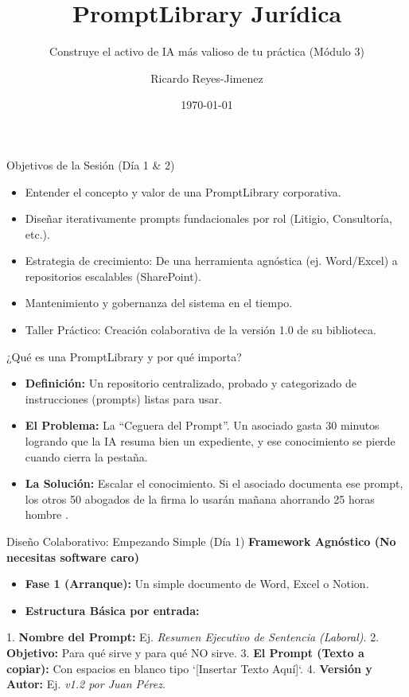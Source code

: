 \documentclass[aspectratio=169]{beamer}
\title[ PromptLibrary Jurídica]{ PromptLibrary Jurídica}
\subtitle{ Construye el activo de IA más valioso de tu práctica (Módulo 3)}
\author{Ricardo Reyes-Jimenez}
\institute{Universidad de La Sabana}
\date{\today}
\begin{document}
\begin{frame}
  \titlepage
\end{frame}

\usebackgroundtemplate{}


\begin{frame}{Objetivos de la Sesión (Día 1 \& 2)}
\begin{itemize}
  \item Entender el concepto y valor de una PromptLibrary corporativa.
  \item Diseñar iterativamente prompts fundacionales por rol (Litigio, Consultoría, etc.).
  \item Estrategia de crecimiento: De una herramienta agnóstica (ej. Word/Excel) a repositorios escalables (SharePoint).
  \item Mantenimiento y gobernanza del sistema en el tiempo.
  \item Taller Práctico: Creación colaborativa de la versión 1.0 de su biblioteca.
\end{itemize}
\end{frame}


\begin{frame}{¿Qué es una PromptLibrary y por qué importa?}
\begin{itemize}
  \item \textbf{Definición:} Un repositorio centralizado, probado y categorizado de instrucciones (prompts) listas para usar.
  \item \textbf{El Problema:} La ``Ceguera del Prompt''. Un asociado gasta 30 minutos logrando que la IA resuma bien un expediente, y ese conocimiento se pierde cuando cierra la pestaña.
  \item \textbf{La Solución:} Escalar el conocimiento. Si el asociado documenta ese prompt, los otros 50 abogados de la firma lo usarán mañana ahorrando 25 horas hombre \cite{murray2024}.
\end{itemize}
\end{frame}


\begin{frame}{Diseño Colaborativo: Empezando Simple (Día 1)}
\textbf{Framework Agnóstico (No necesitas software caro)}
\begin{itemize}
  \item \textbf{Fase 1 (Arranque):} Un simple documento de Word, Excel o Notion.
  \item \textbf{Estructura Básica por entrada:}
\end{itemize}
1. \textbf{Nombre del Prompt:} Ej. \textit{Resumen Ejecutivo de Sentencia (Laboral)}.
2. \textbf{Objetivo:} Para qué sirve y para qué NO sirve.
3. \textbf{El Prompt (Texto a copiar):} Con espacios en blanco tipo `[Insertar Texto Aquí]`.
4. \textbf{Versión y Autor:} Ej. \textit{v1.2 por Juan Pérez}.
\end{frame}
\end{document}
